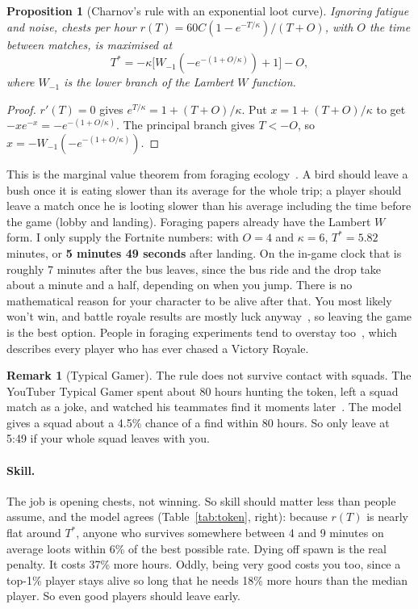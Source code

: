 \documentclass[11pt]{article}
\theoremstyle{definition}
\newtheorem{remark}[definition]{Remark}
\theoremstyle{plain}
\newtheorem{proposition}[definition]{Proposition}
\begin{document}
\begin{proposition}[Charnov's rule with an exponential loot curve]
Ignoring fatigue and noise, chests per hour $r(T) = 60C(1 - e^{-T/\kappa})/(T + O)$, with $O$ the time between matches, is maximised at
\[
T^* = -\kappa\big[W_{-1}(-e^{-(1+O/\kappa)}) + 1\big] - O,
\]
where $W_{-1}$ is the lower branch of the Lambert $W$ function.
\end{proposition}

\begin{proof}
$r'(T)=0$ gives $e^{T/\kappa} = 1 + (T+O)/\kappa$. Put $x = 1 + (T+O)/\kappa$ to get $-xe^{-x} = -e^{-(1+O/\kappa)}$. The principal branch gives $T<-O$, so $x = -W_{-1}(-e^{-(1+O/\kappa)})$.
\end{proof}

This is the marginal value theorem from foraging ecology~\cite{charnov}. A bird should leave a bush once it is eating slower than its average for the whole trip; a player should leave a match once he is looting slower than his average including the time before the game (lobby and landing). Foraging papers already have the Lambert $W$ form. I only supply the Fortnite numbers: with $O = 4$ and $\kappa = 6$, $T^* = 5.82$ minutes, or \textbf{5 minutes 49 seconds} after landing. On the in-game clock that is roughly 7 minutes after the bus leaves, since the bus ride and the drop take about a minute and a half, depending on when you jump. There is no mathematical reason for your character to be alive after that. You most likely won't win, and battle royale results are mostly luck anyway~\cite{rosenbusch}, so leaving the game is the best option. People in foraging experiments tend to overstay too~\cite{saravanakumar}, which describes every player who has ever chased a Victory Royale.

\begin{remark}[Typical Gamer]\label{rem:tg}
The rule does not survive contact with squads. The YouTuber Typical Gamer spent about 80 hours hunting the token, left a squad match as a joke, and watched his teammates find it moments later~\cite{dexerto}. The model gives a squad about a 4.5\% chance of a find within 80 hours. So only leave at 5:49 if your whole squad leaves with you.
\end{remark}

\paragraph{Skill.} The job is opening chests, not winning. So skill should matter less than people assume, and the model agrees (Table~\ref{tab:token}, right): because $r(T)$ is nearly flat around $T^*$, anyone who survives somewhere between 4 and 9 minutes on average loots within 6\% of the best possible rate. Dying off spawn is the real penalty. It costs 37\% more hours. Oddly, being very good costs you too, since a top-1\% player stays alive so long that he needs 18\% more hours than the median player. So even good players should leave early.
\end{document}
